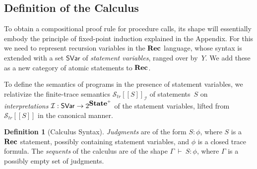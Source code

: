 \documentclass[10pt,a4paper]{amsart}
\theoremstyle{definition}
\newtheorem{definition}[theorem]{Definition}
\newcommand{\dg}[1]{\marginpar{DG: #1}}
\newcommand{\denot}[1]{\left[\!\left[#1\right]\!\right]}
\newcommand{\trcdenot}[1]{\mathcal{S}_{\mathit{tr}}\!\denot{#1}}
\newcommand{\trcdenoti}[1]{\mathcal{S}_{\mathit{tr}}\!\denot{#1}_{\mathcal{I}}}
\newcommand{\Rec}{\mbox{\bf Rec}}
\newcommand{\State}{\mbox{\bf State}}
\newcommand{\judge}[2]{#1 : #2}
\newcommand{\sequent}[2]{#1 \>\vdash\> #2}
\begin{document}



\subsection{Definition of the Calculus}
\label{sec:proof-calculus-rec}

To obtain a compositional proof rule for procedure calls, its shape
will essentially embody the principle of fixed-point induction
explained in the Appendix. %
%
For this we need to represent recursion variables in the $\Rec$
language, whose syntax is extended with a set $\mathsf{SVar}$ of
\emph{statement variables}, ranged over by~$Y$. We add these as a new
category of atomic statements to $\Rec$.


To define the semantics of programs in the presence of statement
variables, we relativize the finite-trace semantics $\trcdenoti{S}$ of
statements~$S$ on \emph{interpretations}
$\mathcal{I} : \mathsf{SVar} \rightarrow 2^{\State^+}$ of the
statement variables, lifted from $\trcdenot{S}$ in the canonical
manner.


\begin{definition}[Calculus Syntax]
  \label{def:calculus-syntax}
  \emph{Judgments} are of the form $\judge{S}{\phi}$, where $S$ is a
  $\Rec$ statement, possibly containing statement variables, and
  $\phi$ is a closed trace formula.
  The \emph{sequents} of the calculus are of the shape
  $\sequent{\Gamma}{\judge{S}{\phi}}$, where $\Gamma$ is a possibly
  empty set of judgments.
\end{definition}

\end{document}

